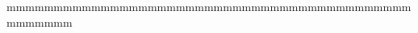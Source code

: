 \documentclass[preview]{standalone}
\begin{document}
\begin{center}
mmmmmmmmmmmmmmmmmmmmmmmmmmmmmmmmmmmmmmmmmmmmmmmmmm
\end{center}
\end{document}
